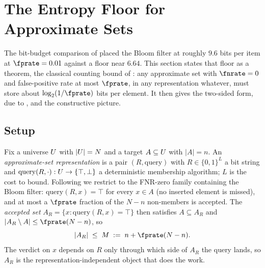 %

\section{The Entropy Floor for Approximate Sets}
\label{sec:entropy-floor}

The bit-budget comparison of  placed the Bloom
filter at roughly $9.6$ bits per item at $\fprate = 0.01$ against a floor near
$6.64$. This section states that floor as a theorem, the classical counting
bound of \textcite{carter-et-al-1978}: any approximate set with $\fnrate = 0$
and false-positive rate at most $\fprate$, in any representation whatever,
must store about $\log_2(1/\fprate)$ bits per element. It then gives the
two-sided form, due to \textcite{pagh-rodler-2001}, and the constructive
picture.

\subsection*{Setup}

Fix a universe $U$ with $|U| = N$ and a target $A \subseteq
U$ with $|A| = n$. An \emph{approximate-set representation} is a pair
$(R, \mathrm{query})$ with $R \in \{0,1\}^L$ a bit string and
$\mathrm{query}(R, \cdot) : U \to \{\top, \bot\}$ a deterministic
membership algorithm; $L$ is the cost to bound. Following 
we restrict to the FNR-zero family containing the Bloom filter:
$\mathrm{query}(R, x) = \top$ for every $x \in A$ (no inserted element is
missed), and at most a $\fprate$ fraction of the $N - n$ non-members is
accepted. The \emph{accepted set} $A_R = \{x : \mathrm{query}(R, x) = \top\}$
then satisfies $A \subseteq A_R$ and $|A_R \setminus A| \le \fprate(N - n)$, so
\begin{equation}
\label{eq:accepted-size}
  |A_R| \;\le\; M \;:=\; n + \fprate(N - n).
\end{equation}
The verdict on $x$ depends on $R$ only through which side of $A_R$ the query
lands, so $A_R$ is the representation-independent object that does the work.

